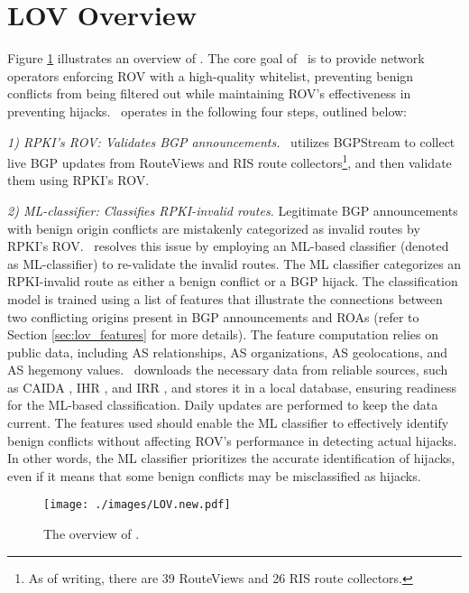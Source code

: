 \vspace{-5pt}
\section{LOV Overview} \label{sec:lov_overview}
Figure \ref{fig:lov_overview} illustrates an overview of \lov. The core goal of \lov\ is to provide network operators enforcing ROV with a high-quality whitelist, preventing benign conflicts from being filtered out while maintaining ROV's effectiveness in preventing hijacks.
\lov\ operates in the following four steps, outlined below:

\noindent\textit{1) RPKI's ROV: Validates BGP announcements.}
\lov\ utilizes BGPStream \cite{orsini2016bgpstream} to collect live BGP updates from RouteViews and RIS route collectors\footnote{As of writing, there are 39 RouteViews and 26 RIS route collectors.}, and then validate them using RPKI's ROV.

\noindent\textit{2) ML-classifier: Classifies RPKI-invalid routes.}
Legitimate BGP announcements with benign origin conflicts are mistakenly categorized as invalid routes by RPKI's ROV.
\lov\ resolves this issue by employing an ML-based classifier (denoted as ML-classifier) to re-validate the invalid routes.
The ML classifier categorizes an RPKI-invalid route as either a benign conflict or a BGP hijack.
The classification model is trained using a list of features that illustrate the connections between two conflicting origins present in BGP announcements and ROAs (refer to Section \ref{sec:lov_features} for more details). The feature computation relies on public data, including AS relationships, AS organizations, AS geolocations, and AS hegemony values.
\lov\ downloads the necessary data from reliable sources, such as CAIDA \cite{CAIDA}, IHR \cite{IHR}, and IRR \cite{IRR}, and stores it in a local database, ensuring readiness for the ML-based classification. Daily updates are performed to keep the data current.
The features used should enable the ML classifier to effectively identify benign conflicts without affecting ROV's performance in detecting actual hijacks.
In other words, the ML classifier prioritizes the accurate identification of hijacks, even if it means that some benign conflicts may be misclassified as hijacks.

\begin{figure}[t!]
\centerline{\texttt{[image: ./images/LOV.new.pdf]}}
\vspace{-10pt}
\caption{\small{The overview of \lov.}}
\label{fig:lov_overview}
\end{figure}

